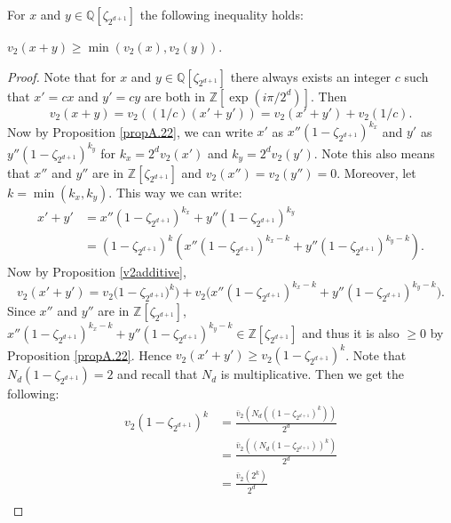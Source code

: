 \documentclass[12pt]{dalthesis}
\begin{document}
\begin{proposition}
\label{v_2min}
For $x$ and $y \in \mathbb{Q}[\zeta_{2^{d+1}}]$ the following inequality holds:
\begin{center}
$v_2 (x + y) \geq \min(v_2 (x), v_2(y))$.
\end{center} 
\end{proposition}
\begin{proof}
Note that for $x$ and $y \in \mathbb{Q}[\zeta_{2^{d+1}}]$ there always exists an integer $c$ such that $x' = cx$ and $y' = cy$ are both in $\mathbb{Z}[\exp(i\pi / 2^d)]$. Then 
\begin{equation*}
v_2(x+y) = v_2((1/c)(x' + y')) = v_2(x' + y') + v_2(1/c).
\end{equation*}
Now by Proposition \ref{propA.22}, we can write $x'$ as $x''(1-\zeta_{2^{d+1}})^{k_x}$ and $y'$ as $y''(1-\zeta_{2^{d+1}})^{k_y}$ for $k_x = 2^dv_2(x')$ and $k_y = 2^dv_2(y')$. Note this also means that $x''$ and $y''$ are in $\mathbb{Z}[\zeta_{2^{d+1}}]$ and $v_2(x'') = v_2(y'') = 0$. Moreover, let $k = \min(k_x, k_y)$. This way we can write:
\begin{equation*}
\begin{split}
x'+y' & = x''(1-\zeta_{2^{d+1}})^{k_x} + y''(1-\zeta_{2^{d+1}})^{k_y} \\
& = (1-\zeta_{2^{d+1}})^k (x''(1-\zeta_{2^{d+1}})^{k_x - k} + y''(1-\zeta_{2^{d+1}})^{k_y - k}).
\end{split}
\end{equation*}
Now by Proposition \ref{v2additive}, 
\begin{equation*}
v_2(x' + y') = v_2\big( 1-\zeta_{2^{d+1}})^k) + v_2(x''(1-\zeta_{2^{d+1}})^{k_x - k} + y''(1-\zeta_{2^{d+1}})^{k_y - k} \big).
\end{equation*}
Since $x''$ and $y''$ are in $\mathbb{Z}[\zeta_{2^{d+1}}]$, $x''(1-\zeta_{2^{d+1}})^{k_x - k} + y''(1-\zeta_{2^{d+1}})^{k_y - k} \in \mathbb{Z}[\zeta_{2^{d+1}}]$ and thus it is also $\geq 0$ by Proposition \ref{propA.22}. Hence $v_2(x'+y') \geq v_2(1-\zeta_{2^{d+1}})^k$. Note that $N_d (1-\zeta_{2^{d+1}}) = 2$ and recall that $N_d$ is multiplicative. Then we get the following:
\begin{equation*}
\begin{split}
v_2(1-\zeta_{2^{d+1}})^k & = \frac{\bar{v}_2 (N_d((1-\zeta_{2^{d+1}})^k))}{2^d} \\
& = \frac{\bar{v}_2 ((N_d(1-\zeta_{2^{d+1}}))^k)}{2^d} \\
& = \frac{\bar{v}_2 (2^k)}{2^d} \\

\end{split}
\end{equation*}
\end{proof}
\end{document}
